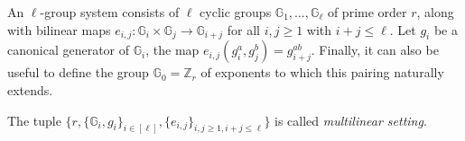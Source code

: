 \documentclass[11pt,a4paper]{article}
\begin{document}
                    
\newpage

                An $\ell$-group system consists of $\ell$
                cyclic groups $\mathbb{G}_1,\ldots,\mathbb{G}_\ell$
                of prime order $r$, along with bilinear maps
                $e_{i,j} : \mathbb{G}_i \times  \mathbb{G}_j \rightarrow \mathbb{G}_{i+j}$
                for all $i,j\geq 1$
                with $i+j\leq\ell$.
                Let $g_i$ be a canonical generator of
                $\mathbb{G}_i$,
                the map $e_{i,j}(g_i^a,g_j^b)=g_{i+j}^{ab}$.
                Finally, it can also be useful to define the group
                $\mathbb{G}_0=\mathbb{Z}_{r}$
                of exponents to which this pairing  naturally extends.

                The tuple
                $\{r,\{\mathbb{G}_i,g_i\}_{i\in[\ell]}, \{e_{i,j}\}_{i,j\geq 1, i+j\leq\ell}\}$
                is called
                {\em multilinear setting}.
                    
\end{document}
